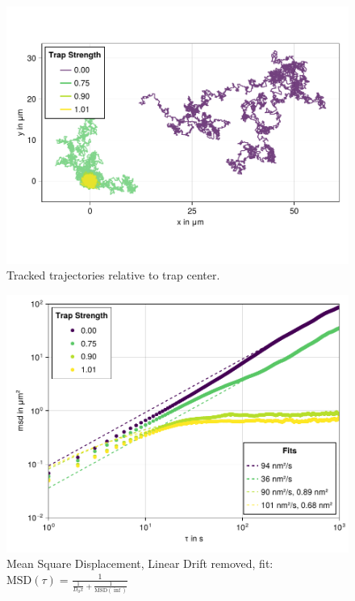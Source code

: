 \documentclass[
    parskip=half, 
    twoside=false,
    twocolumn=true,
    fontsize=11pt,
]{scrarticle}
\begin{document}
\begin{figure}[h]
    \centering
    \includegraphics{figures/01_02_1_trajectories.pdf}
    \caption{Tracked trajectories relative to trap center.}
\end{figure}

\begin{figure}[h]
    \centering
    \includegraphics{figures/01_02_2_msd.pdf}
    \caption{Mean Square Displacement, Linear Drift removed, fit: $\text{MSD}(\tau) = \frac{1}{\frac{1}{D_0 x} + \frac{1}{\text{MSD}(\inf)}} $}
\end{figure}
\end{document}
